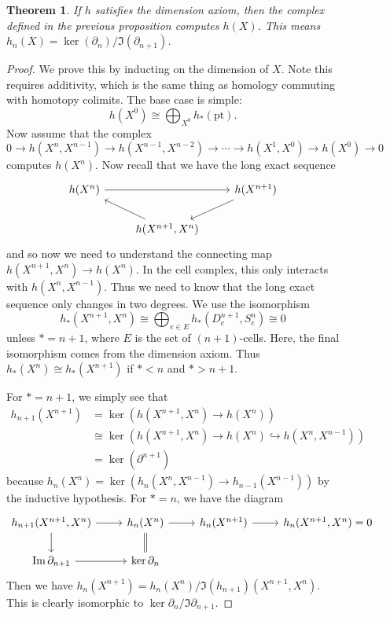 \documentclass[leqno, openany]{memoir}
\newtheorem{thm}{Theorem}[section]
\theoremstyle{definition}
\theoremstyle{remark}
\theoremstyle{plain}
\theoremstyle{definition}
\theoremstyle{remark}
\newcommand{\mr}[1]{\mathrm{#1}}
\begin{document}
\begin{figure}[H]
\begin{thm} If $h$ satisfies the dimension axiom, then the complex defined in
the previous proposition computes $h(X)$. This means $h_n(X) = \ker(\partial_n)
/ \Im(\partial_{n+1})$.  \end{thm}

\begin{proof} We prove this by inducting on the dimension of $X$. Note this
    requires additivity, which is the same thing as homology commuting with
    homotopy colimits. The base case is simple: \[ h(X^0) \cong \bigoplus_{X^0}
    h_*(\mr{pt}). \] Now assume that the complex \[ 0 \to h(X^n, X^{n-1}) \to
    h(X^{n-1}, X^{n-2}) \to \cdots \to h(X^1, X^0) \to h(X^0) \to 0 \] computes
    $h(X^n)$. Now recall that we have the long exact sequence \begin{equation*}
        \begin{tikzcd} h(X^n) \arrow{rr} & & h(X^{n+1}) \arrow{dl} \\ &
        h(X^{n+1}, X^n) \arrow{ul} \end{tikzcd} \end{equation*} and so now we
        need to understand the connecting map $h(X^{n+1}, X^n) \to h(X^n)$. In
        the cell complex, this only interacts with $h(X^n, X^{n-1})$. Thus we
        need to know that the long exact sequence only changes in two degrees.
        We use the isomorphism \[ h_*(X^{n+1}, X^n) \cong \bigoplus_{e \in E}
        h_*(D_e^{n+1}, S_e^n) \cong 0 \] unless $* = n+1$, where $E$ is the set
        of $(n+1)$-cells. Here, the final isomorphism comes from the dimension
        axiom. Thus $h_*(X^n) \cong h_*(X^{n+1})$ if $* < n$ and $* > n+1$.

    For $* = n+1$, we simply see that \begin{align*} h_{n+1}(X^{n+1}) &=
    \ker(h(X^{n+1}, X^n) \to h(X^n)) \\ &\cong \ker(h(X^{n+1}, X^n) \to h(X^n)
\hookrightarrow h(X^n, X^{n-1})) \\ &= \ker(\partial^{n+1}) \end{align*}
because $h_n(X^n) = \ker(h_n(X^n, X^{n-1}) \to h_{n-1}(X^{n-1}))$ by the
inductive hypothesis. For $* = n$, we have the diagram \begin{equation*}
    \begin{tikzcd} h_{n+1}(X^{n+1}, X^n) \arrow{d} \arrow{r} & h_n(X^n)
        \arrow{r} \arrow[equal]{d} & h_n(X^{n+1}) \arrow{r} & h_n(X^{n+1}, X^n)
        = 0 \\ \Im \partial_{n+1} \arrow{r} & \ker \partial_n \end{tikzcd}
    \end{equation*} Then we have $h_n(X^{n+1}) = h_n(X^n) /
\Im(h_{n+1})(X^{n+1}, X^n)$. This is clearly isomorphic to $\ker \partial_n /
\Im \partial_{n+1}$.  \end{proof}


\end{figure}
\end{document}
